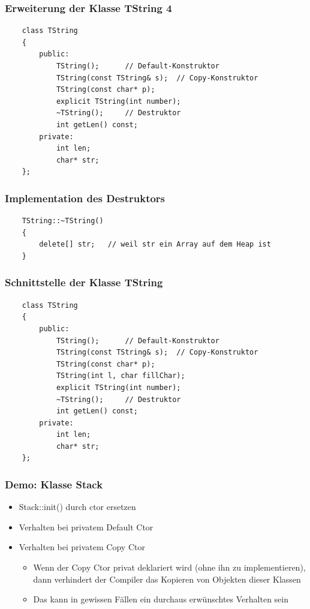 \subsubsection{Erweiterung der Klasse TString 4}
\label{sec:Erweiterung der Klasse TString 4}
\noindent
\begin{minipage}{\linewidth}
	\begin{lstlisting}
	class TString
	{
		public:
			TString();		// Default-Konstruktor
			TString(const TString& s);	// Copy-Konstruktor
			TString(const char* p);
			explicit TString(int number);
			~TString();		// Destruktor
			int getLen() const;
		private:
			int len;
			char* str;
	};
	\end{lstlisting}
\end{minipage}

\subsubsection{Implementation des Destruktors}
\label{sec:Implementation des Destruktors}
\noindent
\begin{minipage}{\linewidth}
	\begin{lstlisting}
	TString::~TString()
	{
		delete[] str;	// weil str ein Array auf dem Heap ist
	}
	\end{lstlisting}
\end{minipage}

\subsubsection{Schnittstelle der Klasse TString}
\label{sec:Schnittstelle der Klasse TString}
\noindent
\begin{minipage}{\linewidth}
	\begin{lstlisting}
	class TString
	{
		public:
			TString();		// Default-Konstruktor
			TString(const TString& s);	// Copy-Konstruktor
			TString(const char* p);
			TString(int l, char fillChar);
			explicit TString(int number);
			~TString();		// Destruktor
			int getLen() const;
		private:
			int len;
			char* str;
	};
	\end{lstlisting}
\end{minipage}

\subsubsection{Demo: Klasse Stack}
\label{sec:Demo: Klasse Stack}
\begin{itemize}
	\item Stack::init() durch ctor ersetzen
	\item Verhalten bei privatem Default Ctor
	\item Verhalten bei privatem Copy Ctor
	\begin{itemize}
		\item Wenn der Copy Ctor privat deklariert wird (ohne ihn zu implementieren), dann verhindert der Compiler das Kopieren von Objekten dieser Klassen
		\item Das kann in gewissen Fällen ein durchaus erwünschtes Verhalten sein
	\end{itemize}
\end{itemize}

